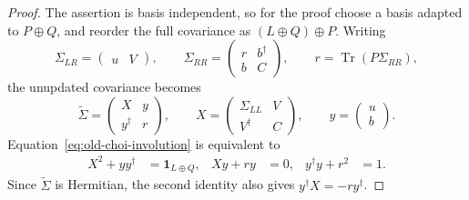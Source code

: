 \documentclass[aps,prb,onecolumn,nofootinbib,superscriptaddress]{revtex4-2}
\newcommand{\I}{\mathbf{1}}
\newcommand{\Tr}{\operatorname{Tr}}
\theoremstyle{plain}
\theoremstyle{definition}
\begin{document}
\begin{proof}
  The assertion is basis independent, so for the proof choose a basis
  adapted to \(P\oplus Q\), and reorder the full covariance as
  \((L\oplus Q)\oplus P\).  Writing
  \begin{equation}
    \Sigma_{LR}=\begin{pmatrix} u & V \end{pmatrix},
    \qquad
    \Sigma_{RR}=
    \begin{pmatrix}
      r & b^\dagger\\
      b & C
    \end{pmatrix},
    \qquad
    r=\Tr(P\Sigma_{RR}),
  \end{equation}
  the unupdated covariance becomes
  \begin{equation}
    \widetilde{\Sigma}
    =
    \begin{pmatrix}
      X & y\\
      y^\dagger & r
    \end{pmatrix},
    \qquad
    X=
    \begin{pmatrix}
      \Sigma_{LL} & V\\
      V^\dagger & C
    \end{pmatrix},
    \qquad
    y=
    \begin{pmatrix}
      u\\ b
    \end{pmatrix}.
    \label{eq:involution-proof-decomposition}
  \end{equation}
  Equation~\eqref{eq:old-choi-involution} is equivalent to
  \begin{align}
    X^2+yy^\dagger &= \I_{L\oplus Q},&
    Xy+r y &=0,&
    y^\dagger y+r^2&=1.
    \label{eq:old-involution-identities}
  \end{align}
  Since \(\widetilde{\Sigma}\) is Hermitian, the second identity also gives
  \(y^\dagger X=-r y^\dagger\).


\end{proof}
\end{document}
